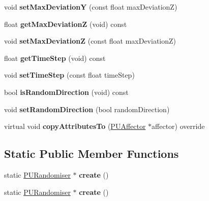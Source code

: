 \begin{DoxyCompactItemize}
\item 
\mbox{\label{classPURandomiser_a3c6822afc69ec2dae5d51f5c739c8dbc}} 
void {\bfseries set\+Max\+DeviationY} (const float max\+DeviationZ)
\item 
\mbox{\label{classPURandomiser_ae8fe05d05003e5f7c450b1d4c4729363}} 
float {\bfseries get\+Max\+DeviationZ} (void) const
\item 
\mbox{\label{classPURandomiser_ab1218d12b856951e80b0794fde36d47d}} 
void {\bfseries set\+Max\+DeviationZ} (const float max\+DeviationZ)
\item 
\mbox{\label{classPURandomiser_a9d153e16caba7a563152fd2fbdfbde4e}} 
float {\bfseries get\+Time\+Step} (void) const
\item 
\mbox{\label{classPURandomiser_abcb3ef96b71f590448474fbe43b955a7}} 
void {\bfseries set\+Time\+Step} (const float time\+Step)
\item 
\mbox{\label{classPURandomiser_a2520aaa7282011388f23e74eeac2f55c}} 
bool {\bfseries is\+Random\+Direction} (void) const
\item 
\mbox{\label{classPURandomiser_a9ff43fcc0606439cdc50f446b395db60}} 
void {\bfseries set\+Random\+Direction} (bool random\+Direction)
\item 
\mbox{\label{classPURandomiser_aa81bb8c527355cee4844628a083eb956}} 
virtual void {\bfseries copy\+Attributes\+To} (\hyperlink{classPUAffector}{P\+U\+Affector} $\ast$affector) override
\end{DoxyCompactItemize}
\subsection*{Static Public Member Functions}
\begin{DoxyCompactItemize}
\item 
\mbox{\label{classPURandomiser_a6681b267a12c3543c22434ed9f02cce5}} 
static \hyperlink{classPURandomiser}{P\+U\+Randomiser} $\ast$ {\bfseries create} ()
\item 
\mbox{\label{classPURandomiser_a7cefcff65fc1f6867c994b28a6527212}} 
static \hyperlink{classPURandomiser}{P\+U\+Randomiser} $\ast$ {\bfseries create} ()
\end{DoxyCompactItemize}
